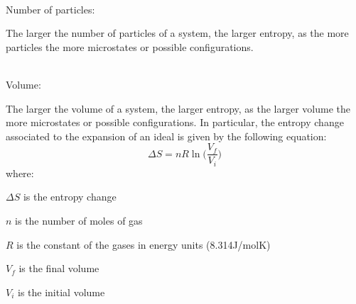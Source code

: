 \documentclass[main.tex]{subfiles}
\newcommand\chapterlabel{entropy}
\begin{document}
\begin{description}
\begin{center}
\end{center}



  
  
     \faCodeFork\ \begin{bf}Number of particles:\end{bf} The larger the number of particles of a system, the larger entropy, as the more particles the more microstates or possible configurations.
    \\ \faCodeFork\ \begin{bf}Volume:\end{bf} The larger the volume of a system, the larger entropy, as the larger volume the more microstates or possible configurations. In particular, the entropy change associated to the expansion of an ideal is given by the following equation:
    \begin{equation}
\boxed{  \Delta S=nR \ln	\Big(\frac{V_f}{V_i}\Big)	}\label{\chapterlabel:equation2}
\end{equation}
where:
\begin{where}
 \item $\Delta S$   is the entropy change
 \item $n$   is the number of moles of gas
 \item $R$  is the constant of the gases in energy units (8.314J/molK)
   \item $V_f$  is the final volume
      \item $V_i$  is the initial volume


\end{where}
\end{description}
\end{document}
